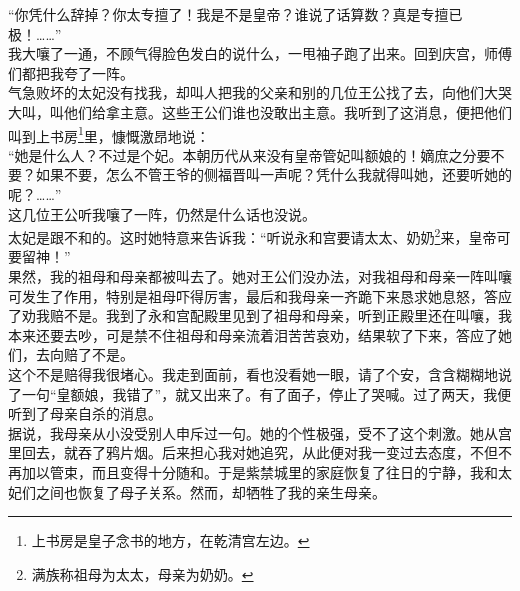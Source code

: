 “你凭什么辞掉？你太专擅了！我是不是皇帝？谁说了话算数？真是专擅已极！……”\\

我大嚷了一通，不顾气得脸色发白的说什么，一甩袖子跑了出来。回到庆宫，师傅们都把我夸了一阵。\\

气急败坏的太妃没有找我，却叫人把我的父亲和别的几位王公找了去，向他们大哭大叫，叫他们给拿主意。这些王公们谁也没敢出主意。我听到了这消息，便把他们叫到上书房\footnote{上书房是皇子念书的地方，在乾清宫左边。}里，慷慨激昂地说：\\

“她是什么人？不过是个妃。本朝历代从来没有皇帝管妃叫额娘的！嫡庶之分要不要？如果不要，怎么不管王爷的侧福晋叫一声呢？凭什么我就得叫她，还要听她的呢？……”\\

这几位王公听我嚷了一阵，仍然是什么话也没说。\\

太妃是跟不和的。这时她特意来告诉我：“听说永和宫要请太太、奶奶\footnote{满族称祖母为太太，母亲为奶奶。}来，皇帝可要留神！”\\

果然，我的祖母和母亲都被叫去了。她对王公们没办法，对我祖母和母亲一阵叫嚷可发生了作用，特别是祖母吓得厉害，最后和我母亲一齐跪下来恳求她息怒，答应了劝我赔不是。我到了永和宫配殿里见到了祖母和母亲，听到正殿里还在叫嚷，我本来还要去吵，可是禁不住祖母和母亲流着泪苦苦哀劝，结果软了下来，答应了她们，去向赔了不是。\\

这个不是赔得我很堵心。我走到面前，看也没看她一眼，请了个安，含含糊糊地说了一句“皇额娘，我错了”，就又出来了。有了面子，停止了哭喊。过了两天，我便听到了母亲自杀的消息。\\

据说，我母亲从小没受别人申斥过一句。她的个性极强，受不了这个刺激。她从宫里回去，就吞了鸦片烟。后来担心我对她追究，从此便对我一变过去态度，不但不再加以管束，而且变得十分随和。于是紫禁城里的家庭恢复了往日的宁静，我和太妃们之间也恢复了母子关系。然而，却牺牲了我的亲生母亲。
